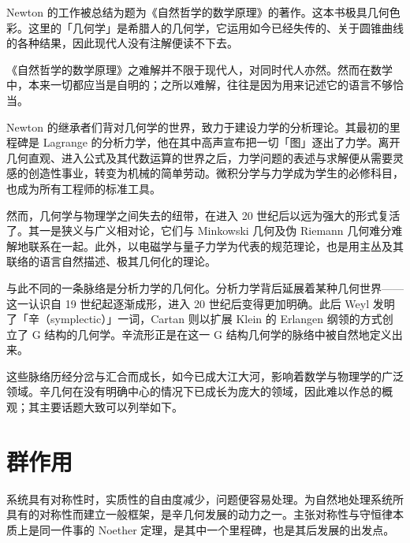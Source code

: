 Newton 的工作被总结为题为《自然哲学的数学原理》的著作。这本书极具几何色彩。这里的「几何学」是希腊人的几何学，它运用如今已经失传的、关于圆锥曲线的各种结果，因此现代人没有注解便读不下去。


《自然哲学的数学原理》之难解并不限于现代人，对同时代人亦然。然而在数学中，本来一切都应当是自明的；之所以难解，往往是因为用来记述它的语言不够恰当。

Newton 的继承者们背对几何学的世界，致力于建设力学的分析理论。其最初的里程碑是 Lagrange 的分析力学，他在其中高声宣布把一切「图」逐出了力学。离开几何直观、进入公式及其代数运算的世界之后，力学问题的表述与求解便从需要灵感的创造性事业，转变为机械的简单劳动。微积分学与力学成为学生的必修科目，也成为所有工程师的标准工具。

然而，几何学与物理学之间失去的纽带，在进入 20 世纪后以远为强大的形式复活了。其一是狭义与广义相对论，它们与 Minkowski 几何及伪 Riemann 几何难分难解地联系在一起。此外，以电磁学与量子力学为代表的规范理论，也是用主丛及其联络的语言自然描述、极其几何化的理论。

与此不同的一条脉络是分析力学的几何化。分析力学背后延展着某种几何世界——这一认识自 19 世纪起逐渐成形，进入 20 世纪后变得更加明确。此后 Weyl 发明了「辛（symplectic）」一词，Cartan 则以扩展 Klein 的 Erlangen 纲领的方式创立了 G 结构的几何学。辛流形正是在这一 G 结构几何学的脉络中被自然地定义出来。


这些脉络历经分岔与汇合而成长，如今已成大江大河，影响着数学与物理学的广泛领域。辛几何在没有明确中心的情况下已成长为庞大的领域，因此难以作总的概观；其主要话题大致可以列举如下。


\section{群作用}

系统具有对称性时，实质性的自由度减少，问题便容易处理。为自然地处理系统所具有的对称性而建立一般框架，是辛几何发展的动力之一。主张对称性与守恒律本质上是同一件事的 Noether 定理，是其中一个里程碑，也是其后发展的出发点。

